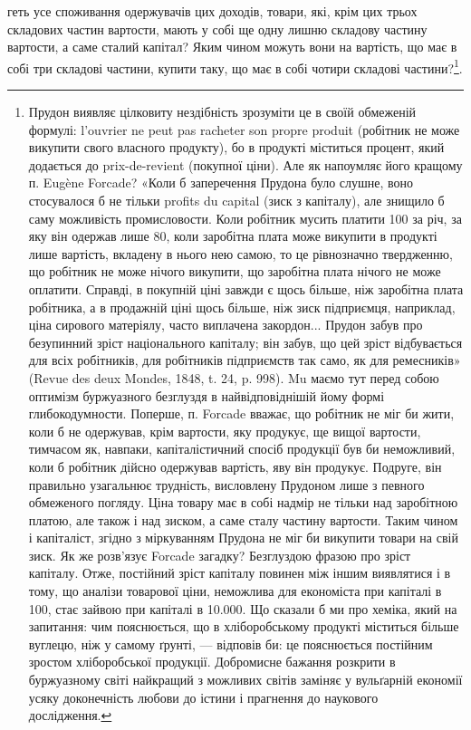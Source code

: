 геть усе споживання одержувачів цих доходів, товари, які, крім цих трьох складових
частин вартости, мають у собі ще одну лишню складову частину вартости,
а саме сталий капітал? Яким чином можуть вони на вартість, що має в
собі три складові частини, купити таку, що має в собі чотири складові частини?\footnote{
Прудон виявляє цілковиту нездібність зрозуміти це в своїй обмеженій формулі: l’ouvrier ne peut
pas racheter son propre produit (робітник не може викупити свого власного продукту), бо в продукті
міститься процент, який додається до prix-de-revient (покупної ціни). Але як напоумляє його кращому
п. Eugène Forcade? «Коли б заперечення Прудона було слушне, воно стосувалося б не тільки profits du
capital (зиск з капіталу), але знищило б саму можливість промисловости. Коли робітник мусить платити
100 за річ, за яку він одержав лише 80, коли заробітна плата може викупити в продукті лише вартість,
вкладену в нього нею самою, то це рівнозначно твердженню, що робітник не може нічого викупити, що
заробітна плата нічого не може оплатити. Справді, в покупній ціні завжди є щось більше, ніж
заробітна плата робітника, а в продажній ціні щось більше, ніж зиск підприємця, наприклад, ціна
сирового матеріялу, часто виплачена закордон... Прудон забув про безупинний зріст національного
капіталу; він забув, що цей зріст відбувається для всіх робітників, для робітників підприємств так
само, як для ремесників» (Revue des deux Mondes, 1848, t. 24, p. 998). Mu маємо тут перед собою
оптимізм буржуазного безглуздя в найвідповіднішій йому формі глибокодумности. Поперше, п. Forcade
вважає, що робітник не міг би жити, коли б не одержував, крім вартости, яку продукує, ще вищої
вартости, тимчасом як, навпаки, капіталістичний спосіб продукції був би неможливий, коли б робітник
дійсно
одержував вартість, яву він продукує. Подруге, він правильно узагальнює трудність, висловлену
Прудоном лише з певного обмеженого погляду. Ціна товару має в собі надмір не тільки над заробітною
платою, але також і над зиском, а саме сталу частину вартости. Таким чином і капіталіст, згідно з
міркуванням Прудона не міг би викупити товари на свій зиск. Як же розв’язує Forcade загадку?
Безглуздою фразою про зріст капіталу. Отже, постійний зріст капіталу повинен між іншим виявлятися і
в тому, що аналізи товарової ціни, неможлива для економіста при капіталі в 100, стає зайвою при
капіталі в 10.000. Що сказали б ми про хеміка, який на запитання: чим пояснюється, що в
хліборобському продукті міститься більше вуглецю, ніж у самому ґрунті, — відповів би: це пояснюється
постійним зростом хліборобської продукції. Добромисне бажання розкрити в буржуазному світі найкращий
з можливих світів заміняє у вульґарній економії усяку доконечність любови до істини і прагнення до
наукового дослідження.
}.

